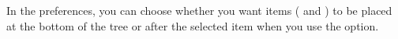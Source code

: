 \label{editorprefs}

In the  preferences, you can choose whether you want items (\gdcases{} and \gdsteps{}) to be placed at the bottom of the tree or after the selected item when you use the  option. 


